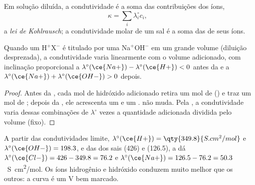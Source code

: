 \begin{proposition}\label{prop:b1:titration-methods:kohlrausch}
Em solução diluída, a condutividade é a soma das contribuições dos
íons,
\[
  \kappa = \sum_i \lambda_i^\circ c_i ,
\]
a \emph{lei de Kohlrausch}; a condutividade molar de
um sal é a soma das de seus íons.
\end{proposition}


\begin{proposition}\label{prop:b1:titration-methods:conductimetric-slopes}
Quando um  H$^+$X$^-$ é titulado por uma 
Na$^+$OH$^-$ em um grande volume (diluição desprezada), a condutividade
varia linearmente com o volume adicionado, com inclinação proporcional a
$\lambda^\circ(\ce{Na+}) - \lambda^\circ(\ce{H+}) < 0$ antes da
 e a $\lambda^\circ(\ce{Na+}) + \lambda^\circ(\ce{OH-}) > 0$
depois.
\end{proposition}

\begin{proof}
Antes da , cada mol de hidróxido adicionado retira um mol de
 () e traz um mol de ; depois da
, ele acrescenta um  e um .  não
muda. Pela , a condutividade varia dessas combinações de
$\lambda^\circ$ vezes a quantidade adicionada dividida pelo volume (fixo).
\end{proof}

A partir das condutividades limite, $\lambda^\circ(\ce{H+}) =
\qty{349.8}{S.cm^2/mol}$ e $\lambda^\circ(\ce{OH-}) = 198.3$, e das dos
sais  (426) e  (126.5), a  dá
$\lambda^\circ(\ce{Cl-}) = 426 - 349.8 = 76.2$ e $\lambda^\circ(\ce{Na+}) =
126.5 - 76.2 = 50.3$~\unit{S.cm^2/mol}. Os íons hidrogênio e hidróxido
conduzem muito melhor que os outros: a curva é um V bem marcado.

